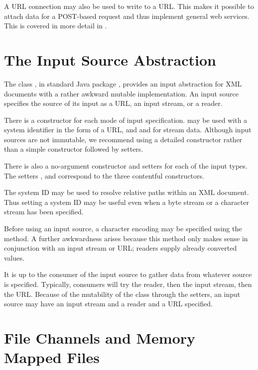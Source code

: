 A URL connection may also be used to write to a URL.  This makes it
possible to attach data for a POST-based request and thus implement
general web services.  This is covered in more detail in .


\section{The Input Source Abstraction}\label{section:io-input-source}

The class , in standard Java package
, provides an input abstraction for XML documents
with a rather awkward mutable implementation.  An input source
specifies the source of its input as a URL, an input stream, or a
reader.

There is a constructor for each mode of input specification.
 may be used with a system identifier in the
form of a URL, and  and
 for stream data.  Although input sources
are not immutable, we recommend using a detailed constructor rather
than a simple constructor followed by setters.

There is also a no-argument constructor  and
setters for each of the input types.  The setters
,  and
 correspond to the three contentful
constructors.

The system ID may be used to resolve relative paths within an XML
document.  Thus setting a system ID may be useful even when a byte
stream or a character stream has been specified. 

Before using an input source, a character encoding may be specified
using the  method.  A further awkwardness
arises because this method only makes sense in conjunction with an
input stream or URL; readers supply already converted 
values.

It is up to the consumer of the input source to gather data from
whatever source is specified.  Typically, consumers will try the
reader, then the input stream, then the URL.  Because of the
mutability of the class through the setters, an input source may have
an input stream and a reader and a URL specified.






\section{File Channels and Memory Mapped Files}


